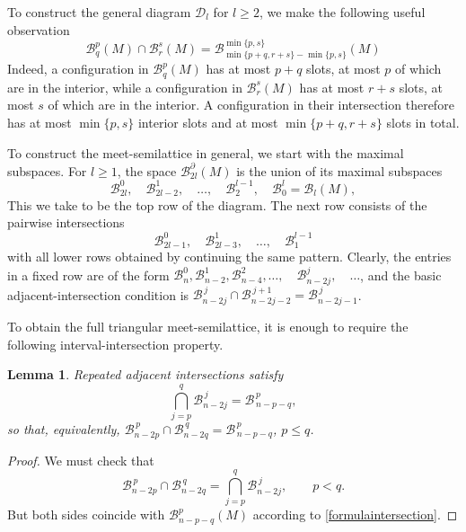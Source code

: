 \documentclass[11pt,a4paper]{article}
\numberwithin{equation}{section}
\newtheorem{lem}[thm]{Lemma}
\theoremstyle{definition}
\theoremstyle{remark}
\newcommand{\pa}{\partial}
\newcommand{\BB}{\mathcal B}
\begin{document}
To construct the general diagram $\mathcal D_l$ for $l\geq 2$, we make the following useful observation 
\begin{equation}\label{formulaintersection}
\BB_q^p(M)\cap \BB_r^s(M)= \BB^{\min \{p,s\}}_{\min \{p+q,r+s\}-\min \{p,s\}} (M)
\end{equation}
Indeed, a configuration in $\BB_q^p(M)$ has at most \(p+q\) slots, at most \(p\) of which are in the interior, while a configuration in $\BB_r^s(M)$ has at most \(r+s\) slots, at most \(s\) of which are in the interior. A configuration in their intersection therefore has at most $\min\{p,s\}$ interior slots and at most $\min\{p+q,r+s\}$ slots in total.

To construct the meet-semilattice in general, we start with the maximal subspaces.
For \(l\ge1\), the space \(\BB_{2l}^{\pa}(M)\) is the union of its maximal subspaces
\[
\BB_{2l}^{0},\quad
\BB_{2l-2}^{1},\quad
\ldots,\quad
\BB_2^{l-1},\quad
\BB_0^l=\BB_l(M),
\]
This we take to be the top row of the diagram. The next row consists of the pairwise intersections
\[
\BB_{2l-1}^{0},\quad
\BB_{2l-3}^{1},\quad
\ldots,\quad
\BB_1^{l-1}
\]
with all lower rows obtained by continuing the same pattern. 
Clearly, the entries in a fixed row are of the form
$\BB_n^0,
\BB_{n-2}^1,
\BB_{n-4}^2,
\ldots,\quad
\BB_{n-2j}^j,\quad
\ldots$, and
the basic adjacent-intersection condition is
$
\BB_{n-2j}^{\,j}
\cap
\BB_{n-2j-2}^{\,j+1}
=
\BB_{n-2j-1}^{\,j}
$.

To obtain the full triangular meet-semilattice, it is enough to require the following interval-intersection property.

\begin{lem}\label{meet}
Repeated adjacent intersections satisfy
\[
\bigcap_{j=p}^{q}\BB_{n-2j}^{\,j}
=
\BB_{\,n-p-q}^{\,p},
\]
so that, equivalently,
$\BB_{n-2p}^{\,p}
\cap
\BB_{n-2q}^{\,q}
=
\BB_{\,n-p-q}^{\,p}$, $
p\le q$.
\end{lem}

\begin{proof}
We must check that
\[
\BB_{n-2p}^{\,p}
\cap
\BB_{n-2q}^{\,q}
=
\bigcap_{j=p}^{q}\BB_{n-2j}^{\,j},
\qquad
p<q.
\]
But both sides coincide with $\BB_{n-p-q}^p(M)$ according to \eqref{formulaintersection}.
\end{proof}
\end{document}
